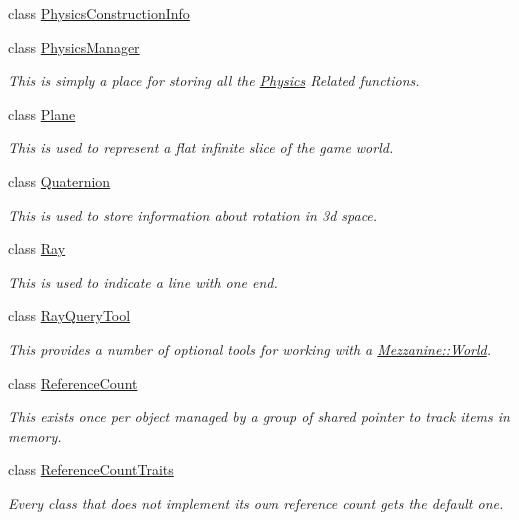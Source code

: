 \begin{DoxyCompactItemize}
class \hyperlink{classMezzanine_1_1PhysicsConstructionInfo}{Physics\-Construction\-Info}
\item 
class \hyperlink{classMezzanine_1_1PhysicsManager}{Physics\-Manager}
\begin{DoxyCompactList}\small\item\em This is simply a place for storing all the \hyperlink{namespaceMezzanine_1_1Physics}{Physics} Related functions. \end{DoxyCompactList}\item 
class \hyperlink{classMezzanine_1_1Plane}{Plane}
\begin{DoxyCompactList}\small\item\em This is used to represent a flat infinite slice of the game world. \end{DoxyCompactList}\item 
class \hyperlink{classMezzanine_1_1Quaternion}{Quaternion}
\begin{DoxyCompactList}\small\item\em This is used to store information about rotation in 3d space. \end{DoxyCompactList}\item 
class \hyperlink{classMezzanine_1_1Ray}{Ray}
\begin{DoxyCompactList}\small\item\em This is used to indicate a line with one end. \end{DoxyCompactList}\item 
class \hyperlink{classMezzanine_1_1RayQueryTool}{Ray\-Query\-Tool}
\begin{DoxyCompactList}\small\item\em This provides a number of optional tools for working with a \hyperlink{classMezzanine_1_1World}{Mezzanine\-::\-World}. \end{DoxyCompactList}\item 
class \hyperlink{classMezzanine_1_1ReferenceCount}{Reference\-Count}
\begin{DoxyCompactList}\small\item\em This exists once per object managed by a group of shared pointer to track items in memory. \end{DoxyCompactList}\item 
class \hyperlink{classMezzanine_1_1ReferenceCountTraits}{Reference\-Count\-Traits}
\begin{DoxyCompactList}\small\item\em Every class that does not implement its own reference count gets the default one. \end{DoxyCompactList}\item 

\end{DoxyCompactItemize}
